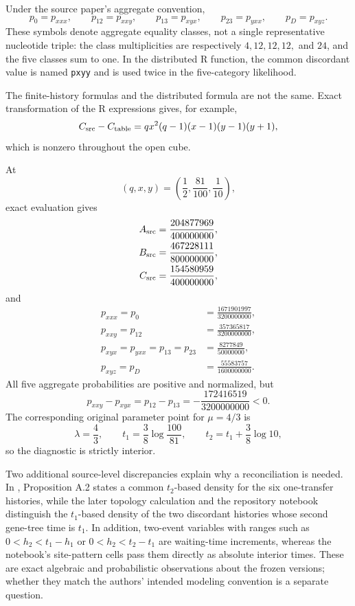 \documentclass[11pt]{article}
\begin{document}
Under the source paper's aggregate convention,
\[
p_0=p_{xxx},\qquad
p_{12}=p_{xxy},\qquad
p_{13}=p_{xyx},\qquad
p_{23}=p_{yxx},\qquad
p_D=p_{xyz}.
\]
These symbols denote aggregate equality classes, not a single representative nucleotide triple: the class multiplicities are respectively $4,12,12,12,$ and $24$, and the five classes sum to one.  In the distributed R function, the common discordant value is named \texttt{pxyy} and is used twice in the five-category likelihood.

The finite-history formulas and the distributed formula are not the same.  Exact transformation of the R expressions gives, for example,
\begin{equation}\label{eq:Cdiff}
C_{\rm src}-C_{\rm table}
=qx^2(q-1)(x-1)(y-1)(y+1),
\end{equation}
which is nonzero throughout the open cube.

At
\[
(q,x,y)=\left(\frac12,\frac{81}{100},\frac1{10}\right),
\]
exact evaluation gives
\begin{align*}
A_{\rm src}&=\frac{204877969}{400000000},\\
B_{\rm src}&=\frac{467228111}{800000000},\\
C_{\rm src}&=\frac{154580959}{400000000},
\end{align*}
and
\begin{align*}
p_{xxx}=p_0&=\frac{1671901997}{3200000000},\\
p_{xxy}=p_{12}&=\frac{357365817}{3200000000},\\
p_{xyx}=p_{yxx}=p_{13}=p_{23}&=\frac{8277849}{50000000},\\
p_{xyz}=p_D&=\frac{55583757}{1600000000}.
\end{align*}
All five aggregate probabilities are positive and normalized, but
\[
p_{xxy}-p_{xyx}=p_{12}-p_{13}
=-\frac{172416519}{3200000000}<0.
\]
The corresponding original parameter point for $\mu=4/3$ is
\[
\lambda=\frac43,
\qquad
t_1=\frac38\log\frac{100}{81},
\qquad
t_2=t_1+\frac38\log10,
\]
so the diagnostic is strictly interior.

Two additional source-level discrepancies explain why a reconciliation is needed.  In , Proposition A.2 states a common $t_2$-based density for the six one-transfer histories, while the later topology calculation and the repository notebook distinguish the $t_1$-based density of the two discordant histories whose second gene-tree time is $t_1$.  In addition, two-event variables with ranges such as $0<h_2<t_1-h_1$ or $0<h_2<t_2-t_1$ are waiting-time increments, whereas the notebook's site-pattern cells pass them directly as absolute interior times.  These are exact algebraic and probabilistic observations about the frozen versions; whether they match the authors' intended modeling convention is a separate question.
\end{document}

